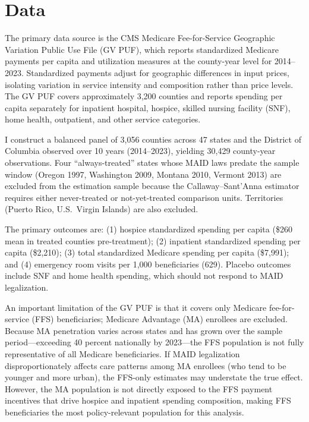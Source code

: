 \documentclass[12pt]{article}
\begin{document}
\section{Data}
\label{sec:data}

The primary data source is the CMS Medicare Fee-for-Service Geographic Variation Public Use File (GV PUF), which reports standardized Medicare payments per capita and utilization measures at the county-year level for 2014--2023. Standardized payments adjust for geographic differences in input prices, isolating variation in service intensity and composition rather than price levels. The GV PUF covers approximately 3,200 counties and reports spending per capita separately for inpatient hospital, hospice, skilled nursing facility (SNF), home health, outpatient, and other service categories.

I construct a balanced panel of 3,056 counties across 47 states and the District of Columbia observed over 10 years (2014--2023), yielding 30,429 county-year observations. Four ``always-treated'' states whose MAID laws predate the sample window (Oregon 1997, Washington 2009, Montana 2010, Vermont 2013) are excluded from the estimation sample because the Callaway--Sant'Anna estimator requires either never-treated or not-yet-treated comparison units. Territories (Puerto Rico, U.S.\ Virgin Islands) are also excluded.

The primary outcomes are: (1) hospice standardized spending per capita (\$260 mean in treated counties pre-treatment); (2) inpatient standardized spending per capita (\$2,210); (3) total standardized Medicare spending per capita (\$7,991); and (4) emergency room visits per 1,000 beneficiaries (629). Placebo outcomes include SNF and home health spending, which should not respond to MAID legalization.

An important limitation of the GV PUF is that it covers only Medicare fee-for-service (FFS) beneficiaries; Medicare Advantage (MA) enrollees are excluded. Because MA penetration varies across states and has grown over the sample period---exceeding 40 percent nationally by 2023---the FFS population is not fully representative of all Medicare beneficiaries. If MAID legalization disproportionately affects care patterns among MA enrollees (who tend to be younger and more urban), the FFS-only estimates may understate the true effect. However, the MA population is not directly exposed to the FFS payment incentives that drive hospice and inpatient spending composition, making FFS beneficiaries the most policy-relevant population for this analysis.
\end{document}

